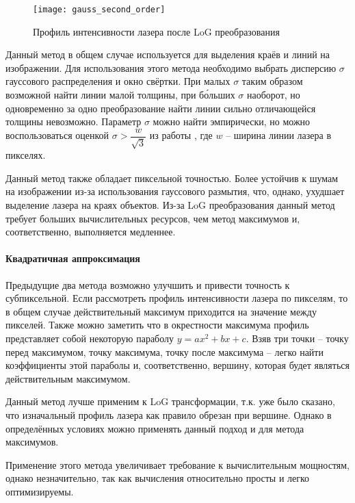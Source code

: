                 \begin{wrapfigure}{r}{0.4\linewidth}
                    \centering
                    \texttt{[image: gauss\_second\_order]}
                    \caption{Профиль интенсивности лазера после LoG преобразования}
                \end{wrapfigure}
                Данный метод в общем случае используется для выделения краёв и линий на изображении\cite{Steger2000}. Для использования этого метода необходимо выбрать дисперсию $ \sigma $ гауссового распределения и окно свёртки. При малых $ \sigma $ таким образом возможной найти линии малой толщины, при б\'{о}льших $ \sigma $ наоборот, но одновременно за одно преобразование найти линии сильно отличающейся толщины невозможно. Параметр $ \sigma $ можно найти эмпирически, но можно воспользоваться оценкой $ \sigma > \dfrac{w}{\sqrt{3}} $ из работы \cite{Steger2000}, где $ w $ -- ширина линии лазера в пикселях.
                
                Данный метод также обладает пиксельной точностью. Более устойчив к шумам на изображении из-за использования гауссового размытия, что, однако, ухудшает выделение лазера на краях объектов. Из-за LoG преобразования данный метод требует больших вычислительных ресурсов, чем метод максимумов и, соответственно, выполняется медленнее.
            
            \paragraph{Квадратичная аппроксимация}
                Предыдущие два метода возможно улучшить и привести точность к субпиксельной\cite{Molder2014}. Если рассмотреть профиль интенсивности лазера по пикселям, то в общем случае действительный максимум приходится на значение между пикселей. Также можно заметить что в окрестности максимума профиль представляет собой некоторую параболу $ y = ax^2 + bx + c $. Взяв три точки -- точку перед максимумом, точку максимума, точку после максимума -- легко найти коэффициенты этой параболы и, соответственно, вершину, которая будет являться действительным максимумом.
                
                Данный метод лучше применим к LoG трансформации, т.к. уже было сказано, что изначальный профиль лазера как правило обрезан при вершине. Однако в определённых условиях можно применять данный подход и для метода максимумов.
                
                Применение этого метода увеличивает требование к вычислительным мощностям, однако незначительно, так как вычисления относительно просты и легко оптимизируемы.
            
